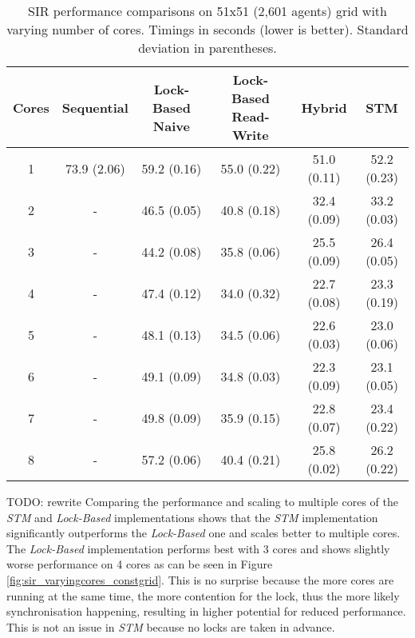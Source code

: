 \begin{table}
	\centering
  	\begin{tabular}{ c || c | c | c | c | c }
        Cores & Sequential  & Lock-Based Naive   & Lock-Based Read-Write & Hybrid    & STM             \\ \hline \hline 
   		1     & 73.9 (2.06) & 59.2 (0.16) &  55.0 (0.22) & 51.0 (0.11) & 52.2 (0.23) \\ \hline
   		2     & -           & 46.5 (0.05) &  40.8 (0.18) & 32.4 (0.09) & 33.2 (0.03) \\ \hline
   		3     & -           & 44.2 (0.08) &  35.8 (0.06) & 25.5 (0.09) & 26.4 (0.05) \\ \hline
   		4     & -           & 47.4 (0.12) &  34.0 (0.32) & 22.7 (0.08) & 23.3 (0.19) \\ \hline
   		5     & -           & 48.1 (0.13) &  34.5 (0.06) & 22.6 (0.03) & 23.0 (0.06) \\ \hline
   		6     & -           & 49.1 (0.09) &  34.8 (0.03) & 22.3 (0.09) & 23.1 (0.05) \\ \hline
   		7     & -           & 49.8 (0.09) &  35.9 (0.15) & 22.8 (0.07) & 23.4 (0.22) \\ \hline
   		8     & -           & 57.2 (0.06) &  40.4 (0.21) & 25.8 (0.02) & 26.2 (0.22) \\ \hline \hline
  	\end{tabular}

		
  	\caption{SIR performance comparisons on 51x51 (2,601 agents) grid with varying number of cores. Timings in seconds (lower is better). Standard deviation in parentheses.}
	\label{tab:sir_varyingcores_constgrid}
\end{table}

TODO: rewrite 
Comparing the performance and scaling to multiple cores of the \textit{STM} and \textit{Lock-Based} implementations shows that the \textit{STM} implementation significantly outperforms the \textit{Lock-Based} one and scales better to multiple cores. The \textit{Lock-Based} implementation performs best with 3 cores and shows slightly worse performance on 4 cores as can be seen in Figure \ref{fig:sir_varyingcores_constgrid}. This is no surprise because the more cores are running at the same time, the more contention for the lock, thus the more likely synchronisation happening, resulting in higher potential for reduced performance. This is not an issue in \textit{STM} because no locks are taken in advance. 

